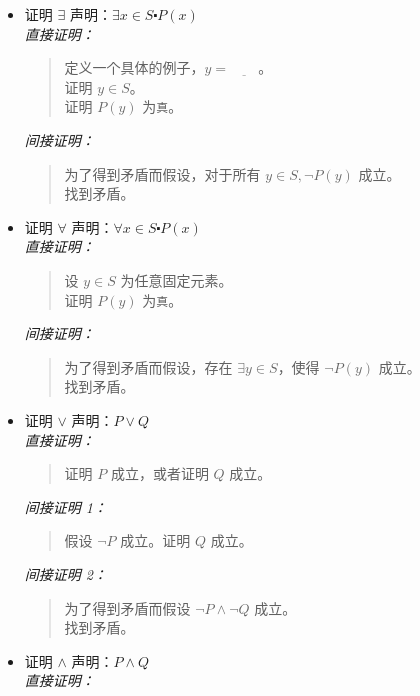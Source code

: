 \begin{itemize}
    \item 证明 $\exists$ 声明：$\exists x \in S \centerdot P(x)$\\
            \emph{直接证明：}
            \begin{quote}
                定义一个具体的例子，$y=\underline{\qquad}$。\\
                证明 $y \in S$。\\
                证明 $P(y)$ 为\verb|真|。
            \end{quote}
            \emph{间接证明：}
            \begin{quote}
                为了得到矛盾而假设，对于所有 $y \in S, \neg P(y)$ 成立。\\
                找到矛盾。
            \end{quote}
    \item 证明 $\forall$ 声明：$\forall x \in S \centerdot P(x)$\\
            \emph{直接证明：}
            \begin{quote}
                设 $y \in S$ 为任意固定元素。\\
                证明 $P(y)$ 为\verb|真|。
            \end{quote}
            \emph{间接证明：}
            \begin{quote}
                为了得到矛盾而假设，存在 $\exists y \in S$，使得 $\neg P(y)$ 成立。\\
                找到矛盾。
            \end{quote}
    \item 证明 $\lor$ 声明：$P \lor Q$\\
            \emph{直接证明：}
            \begin{quote}
                证明 $P$ 成立，或者证明 $Q$ 成立。
            \end{quote}
            \emph{间接证明 1：}
            \begin{quote}
                假设 $\neg P$ 成立。证明 $Q$ 成立。
            \end{quote}
            \emph{间接证明 2：}
            \begin{quote}
                为了得到矛盾而假设 $\neg P \land \neg Q$ 成立。\\
                找到矛盾。
            \end{quote}
    \item 证明 $\land$ 声明：$P \land Q$\\
            \emph{直接证明：}

\end{itemize}
